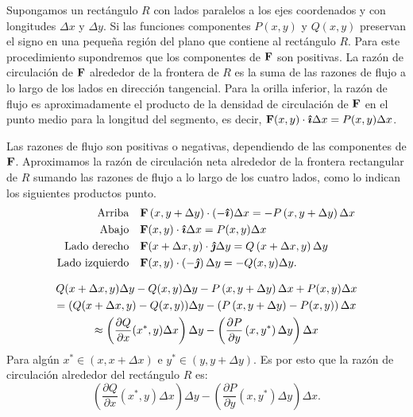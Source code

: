 Supongamos un rectángulo $R$ con lados paralelos a los ejes coordenados y con longitudes $\Delta x$ y $\Delta y$. Si las funciones componentes
$P(x,y) $ y $Q(x,y) $ preservan el signo en una pequeña región del plano que contiene al rectángulo $R$.
Para este procedimiento supondremos que los componentes de ${\bf F} $ son positivas.
La razón de circulación de ${\bf F} $ alrededor de la frontera de $R$ es la suma de las razones de flujo a lo largo de los lados en dirección tangencial. Para la orilla inferior, la razón de flujo es aproximadamente el producto de la densidad de circulación de ${\bf F}$ en el punto medio para la longitud del segmento, es decir,
${\bf F} (x,y)\cdot\boldsymbol{\hat{\imath}}\Delta x=P(x,y)\Delta x$.

Las razones de flujo son positivas o negativas, dependiendo de las componentes de ${\bf F} $. Aproximamos la razón de circulación neta alrededor de la frontera rectangular de $R$ sumando las razones de flujo a lo largo de los cuatro lados, como lo indican los siguientes productos punto.
\begin{align*}
\text{Arriba} \quad &  {\bf F} \left( x,y+\Delta y\right) \cdot (-\boldsymbol{\hat{\imath}}) \Delta x=-P\left( x,y+\Delta y\right) \Delta x \\
\text{Abajo} \quad & {\bf F} (x,y) \cdot \boldsymbol{\hat{\imath}}\Delta x=P(x,y) \Delta x \\
\text{Lado derecho} \quad & {\bf F} ( x+\Delta x,y) \cdot \boldsymbol{\hat{\jmath}}\Delta y=Q\left(x+\Delta x,y\right) \Delta y \\
\text{Lado izquierdo} \quad & {\bf F} (x,y) \cdot \left( -\boldsymbol{\hat{\jmath}}\right) \Delta y=-Q(x,y) \Delta y.
\end{align*}

\begin{gather}
Q( x+\Delta x,y) \Delta y-Q(x,y) \Delta y-P\left(x,y+\Delta y\right) \Delta x+P(x,y) \Delta x \notag\\
=(Q( x+\Delta x,y) -Q(x,y)) \Delta y-\left(P\left( x,y+\Delta y\right) -P(x,y) \right) \Delta x \notag \\
\approx \left( \frac{\partial Q}{\partial x}(x^{\ast },y)\Delta x\right) \Delta y-\left( \frac{\partial P}{\partial y}\left(x,y^{\ast }\right) \Delta y\right) \Delta x
\end{gather}
Para algún $x^* \in (x,x+\Delta x)$ e $y^* \in (y,y+\Delta y)$.
Es por esto que la razón de circulación alrededor del rectángulo $R$ es:
\[\left( \frac{\partial Q}{\partial x}(x^{\ast },y) \Delta x\right) \Delta y-\left( \frac{\partial P}{\partial y}\left( x,y^{\ast }\right) \Delta y\right) \Delta x.\]

